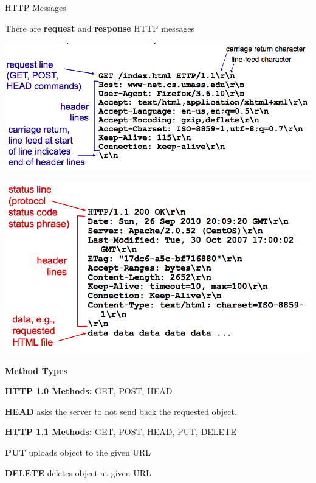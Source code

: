 \begin{topic}{HTTP Messages}

There are \textbf{request} and \textbf{response} HTTP messages

\begin{subtopic}{2}
\includegraphics[scale=0.35]{coms3200/images/request}
\end{subtopic}

\begin{subtopic}{3}
\includegraphics[scale=0.35]{coms3200/images/response}
\end{subtopic}

\begin{subtopic}{4}
\textbf{Method Types}
\begin{multicols}{2}
\textbf{HTTP 1.0 Methods:} GET, POST, HEAD

\textbf{HEAD} asks the server to not send back the requested object.

\columnbreak

\textbf{HTTP 1.1 Methods:} GET, POST, HEAD, PUT, DELETE

\textbf{PUT} uploads object to the given URL

\textbf{DELETE} deletes object at given URL
\end{multicols}
\end{subtopic}


\end{topic}
